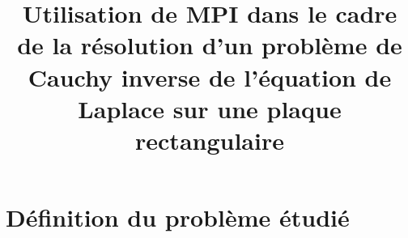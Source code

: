 \documentclass[11pt]{article}
\begin{document}
    \title{Utilisation de MPI dans le cadre de la résolution d'un problème de Cauchy inverse de l'équation de Laplace sur une plaque rectangulaire}

    \maketitle
    \tableofcontents

    \section{Définition du problème étudié}
\end{document}
